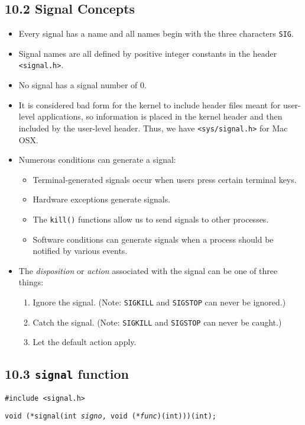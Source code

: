 \documentclass[]{article} \usepackage[all]{xy}
\newcommand{\code}{\texttt}
\begin{document}
\subsection*{10.2 Signal Concepts}
\begin{itemize}
\item Every signal has a name and all names begin with the three characters
\texttt{SIG}.
\item Signal names are all defined by positive integer constants in the header
\texttt{<signal.h>}.
\item No signal has a signal number of 0.
\item It is considered bad form for the kernel to include header files meant
for user-level applications, so information is placed in the kernel header and
then included by the user-level header. Thus, we have \code{<sys/signal.h>}
for Mac OSX.
\item Numerous conditions can generate a signal:
\begin{itemize}
\item Terminal-generated signals occur when users press certain terminal keys.
\item Hardware exceptions generate signals.
\item The \code{kill()} functions allow us to send signals to other processes.
\item Software conditions can generate signals when a process should be notified
by various events.
\end{itemize}
\item The \emph{disposition} or \emph{action} associated with the signal can be
one of three things:
\begin{enumerate}
\item Ignore the signal. (Note: \code{SIGKILL} and \code{SIGSTOP} can never
be ignored.)
\item Catch the signal. (Note: \code{SIGKILL} and \code{SIGSTOP} can never
be caught.)
\item Let the default action apply.
\end{enumerate}
\end{itemize}

\subsection*{10.3 \code{signal} function}
\texttt{\#include <signal.h>}

\texttt{void (*signal(int \emph{signo}, void (*\emph{func})(int)))(int);}
\end{document}

